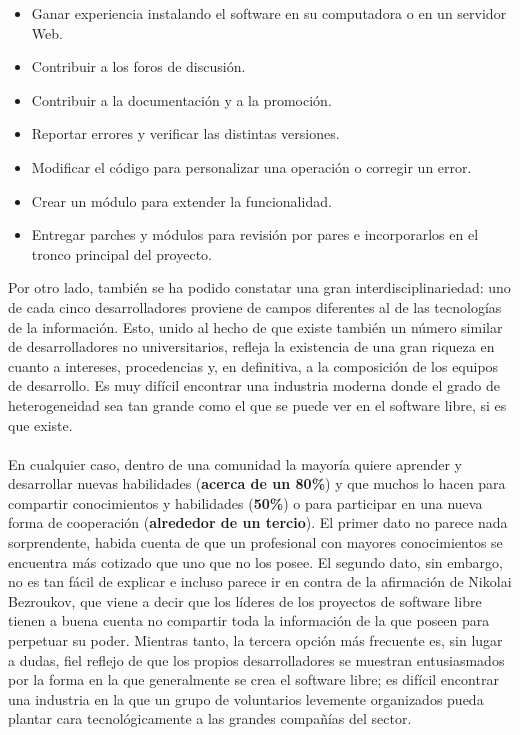 \documentclass{book}
\begin{document}
\begin{itemize}
     \item Ganar experiencia instalando el software en su computadora o en un servidor Web. 
     \item Contribuir a los foros de discusión.
     \item Contribuir a la documentación y a la promoción.
     \item Reportar errores y verificar las distintas versiones.
     \item Modificar el código para personalizar una operación o corregir un error.
     \item Crear un módulo para extender la funcionalidad.
     \item Entregar parches y módulos para revisión por pares e incorporarlos en el tronco principal del proyecto.
\end{itemize}
\newpage
Por otro lado, también se ha podido constatar una gran interdisciplinariedad: uno de cada cinco desarrolladores proviene de campos diferentes al de las tecnologías de la información. Esto, unido al hecho de que existe también un número similar de desarrolladores no universitarios, refleja la existencia de una gran riqueza en cuanto a intereses, procedencias y, en definitiva, a la composición de los equipos de desarrollo. Es muy difícil encontrar una industria moderna donde el grado de heterogeneidad sea tan grande como el que se puede ver en el software libre, si es que existe.
\\
\\
En cualquier caso, dentro de una comunidad la mayoría quiere aprender y desarrollar nuevas habilidades ({\bf acerca de un 80\%}) y que muchos lo hacen para compartir conocimientos y habilidades ({\bf 50\%}) o para participar en una nueva forma de cooperación ({\bf alrededor de un tercio}). El primer dato no parece nada sorprendente, habida cuenta de que un profesional con mayores conocimientos se encuentra más cotizado que uno que no los posee. El segundo dato, sin embargo, no es tan fácil de explicar e incluso parece ir en contra de la afirmación de Nikolai Bezroukov, que viene a decir que los líderes de los proyectos de software libre tienen a buena cuenta no compartir toda la información de la que poseen para perpetuar su poder. Mientras tanto, la tercera opción más frecuente es, sin lugar a dudas, fiel reflejo de que los propios desarrolladores se muestran entusiasmados por la forma en la que generalmente se crea el software libre; es difícil encontrar una industria en la que un grupo de voluntarios levemente organizados pueda plantar cara tecnológicamente a las grandes compañías del sector.
\end{document}
